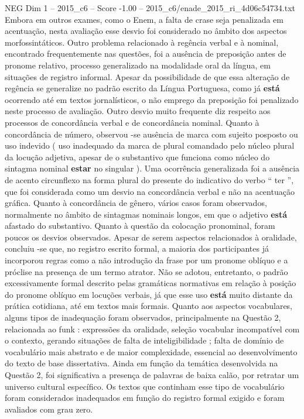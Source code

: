 \begin{textsample}{NEG Dim 1 – 2015\_c6 – Score -1.00 – 2015\_c6/enade\_2015\_ri\_4d06c54734.txt}
Embora em outros exames, como o Enem, a falta de crase seja penalizada em acentuação, nesta avaliação esse desvio foi considerado no âmbito dos aspectos morfossintáticos.
Outro problema relacionado à regência verbal e à nominal, encontrado frequentemente nas questões, foi a ausência de preposição antes de pronome relativo, processo generalizado na modalidade oral da língua, em situações de registro informal.
Apesar da possibilidade de que essa alteração de regência se generalize no padrão escrito da Língua Portuguesa, como já \textbf{está} ocorrendo até em textos jornalísticos, o não emprego da preposição foi penalizado neste processo de avaliação.
Outro desvio muito frequente diz respeito aos processos de concordância verbal e de concordância nominal.
Quanto à concordância de número, observou -se ausência de marca com sujeito posposto ou uso indevido ( uso inadequado da marca de plural comandado pelo núcleo plural da locução adjetiva, apesar de o substantivo que funciona como núcleo do sintagma nominal \textbf{estar} no singular ).
Uma ocorrência generalizada foi a ausência de acento circunflexo na forma plural do presente do indicativo do verbo “ ter ”, que foi considerada como um desvio na concordância verbal e não na acentuação gráfica.
Quanto à concordância de gênero, vários casos foram observados, normalmente no âmbito de sintagmas nominais longos, em que o adjetivo \textbf{está} afastado do substantivo.
Quanto à questão da colocação pronominal, foram poucos os desvios observados.
Apesar de serem aspectos relacionados à oralidade, concluiu -se que, no registro escrito formal, a maioria dos participantes já incorporou regras como a não introdução da frase por um pronome oblíquo e a próclise na presença de um termo atrator.
Não se adotou, entretanto, o padrão excessivamente formal descrito pelas gramáticas normativas em relação à posição do pronome oblíquo em locuções verbais, já que esse uso \textbf{está} muito distante da prática cotidiana, até em textos mais formais.
Quanto aos aspectos vocabulares, alguns tipos de inadequação foram observados, principalmente na Questão 2, relacionada ao funk : expressões da oralidade, seleção vocabular incompatível com o contexto, gerando situações de falta de inteligibilidade ; falta de domínio de vocabulário mais abstrato e de maior complexidade, essencial ao desenvolvimento do texto de base dissertativa.
Ainda em função da temática desenvolvida na Questão 2, foi significativa a presença de palavras de baixa calão, por retratar um universo cultural específico.
Os textos que continham esse tipo de vocabulário foram considerados inadequados em função do registro formal exigido e foram avaliados com grau zero.

\end{textsample}
